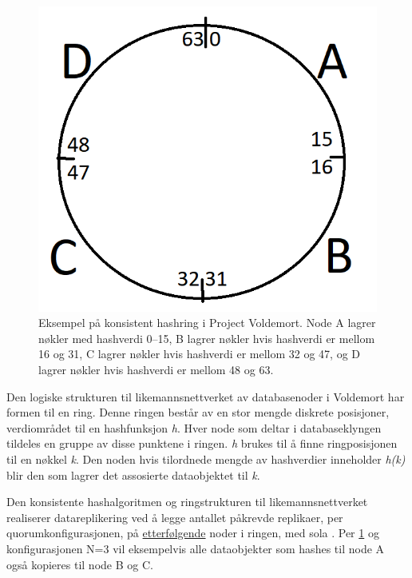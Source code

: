 \begin{figure}[!ht]
    \centering
    \includegraphics{fig/hashring.png}
    \caption{Eksempel på konsistent hashring i Project Voldemort. Node A lagrer nøkler med hashverdi 0--15, B lagrer nøkler hvis hashverdi er mellom 16 og 31, C lagrer nøkler hvis hashverdi er mellom 32 og 47, og D lagrer nøkler hvis hashverdi er mellom 48 og 63.}
    \label{fig4}
\end{figure}

Den logiske strukturen til likemannsnettverket av databasenoder i Voldemort har formen til en ring. Denne ringen består av en stor mengde diskrete posisjoner, verdiområdet til en hashfunksjon \emph{h}. Hver node som deltar i databaseklyngen tildeles en gruppe av disse punktene i ringen. \emph{h} brukes til å finne ringposisjonen til en nøkkel \emph{k}. Den noden hvis tilordnede mengde av hashverdier inneholder \emph{h(k)} blir den som lagrer det assosierte dataobjektet til \emph{k}.

Den konsistente hashalgoritmen og ringstrukturen til likemannsnettverket realiserer datareplikering ved å legge antallet påkrevde replikaer, per quorumkonfigurasjonen, på \underline{etterfølgende} noder i ringen, med sola \citep{elmasri2014}. Per \ref{fig4} og konfigurasjonen N=3 vil eksempelvis alle dataobjekter som hashes til node A også kopieres til node B og C.

